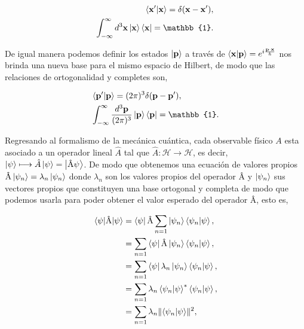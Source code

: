 \begin{equation*}
    \begin{split}
	    \braket{ \textbf{x}'}{\textbf{x}}=\delta(\textbf{x}-\textbf{x}'),\\
        \int_{-\infty}^{\infty} d^{3}\textbf{x} \ket{\textbf{x}}\bra{\textbf{x}}=\mathbb{1}.
    \end{split}	
\end{equation*}

De igual manera podemos definir los estados $ \ket{\textbf{p}} $ a través de $ \braket{ \textbf{x}}{\textbf{p}}=e^{i\frac{\textbf{p}\cdot\textbf{x}}{\hbar}} $ nos brinda una nueva base para el mismo espacio de Hilbert, de modo que las relaciones de ortogonalidad y completes son, 

\begin{equation*}
    \begin{split}
        &\braket{ \textbf{p}'}{\textbf{p}}=(2\pi)^{3}\delta(\textbf{p}-\textbf{p}'),\\
        &\int_{-\infty}^{\infty} \frac{d^{3}\textbf{p}}{(2\pi)^{3}} \ket{\textbf{p}}\bra{\textbf{p}}=\mathbb{1}.
    \end{split}
\end{equation*}

Regresando al formalismo de la mecánica cuántica, cada observable físico $A$  esta asociado a un operador lineal  $\hat{A}$ tal que $ \hat{A} \colon \mathcal{H} \longrightarrow \mathcal{H} $, es decir, $ \ket{\psi}\longmapsto  \hat{A} \ket{\psi} =\ket{\text{\^{A}}\psi} $. De modo que obtenemos una ecuación de valores propios $ \text{\^{A}}\ket{\psi_{n}}=\lambda_{n}\ket{\psi_{n}} $ donde $ \lambda_{n} $ son los valores propios del operador \^{A} y $ \ket{\psi_{n}} $ sus vectores propios que constituyen una base ortogonal y completa de modo que podemos usarla para poder obtener el valor esperado del operador \^{A}, esto es,

\begin{equation*}
    \begin{split}
        \expval{\text{\^{A}}}{\psi}&=\bra{\psi}\text{\^{A}} \displaystyle\sum_{n=1} \ket{\psi_{n}}\bra{\psi_{n}}\ket{\psi},\\
        &=\displaystyle\sum_{n=1}\bra{\psi}\text{\^{A}} \ket{\psi_{n}}\bra{\psi_{n}}\ket{\psi},\\
        &=\displaystyle\sum_{n=1}\bra{\psi}\lambda_{n}\ket{\psi_{n}}\bra{\psi_{n}}\ket{\psi},\\
        &=\displaystyle\sum_{n=1}\lambda_{n}\bra{\psi_n}\ket{\psi}^{*}\bra{\psi_{n}}\ket{\psi},\\
        &=\displaystyle\sum_{n=1}\lambda_{n}\lVert\bra{\psi_{n}}\ket{\psi}\rVert^{2},
    \end{split}
\end{equation*}

